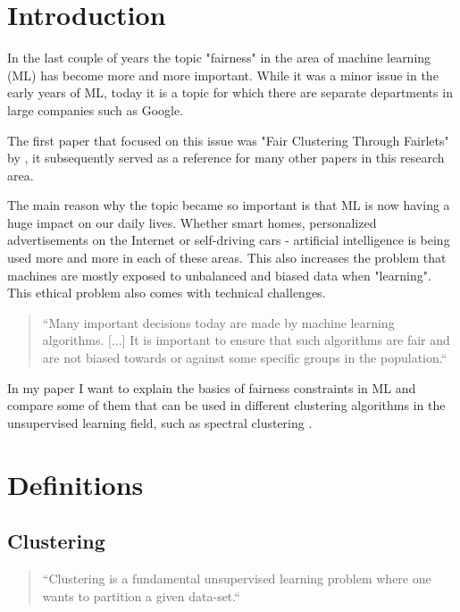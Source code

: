 \section{Introduction}

In the last couple of years the topic "fairness" in the area of machine learning (ML) has become more and more important. While it was a minor issue in the early years of ML, today it is a topic for which there are separate departments in large companies such as Google.

The first paper that focused on this issue was "Fair Clustering Through Fairlets" by \cite{Chierichetti2018}, it subsequently served as a reference for many other papers in this research area.

The main reason why the topic became so important is that ML is now having a huge impact on our daily lives. Whether smart homes, personalized advertisements on the Internet or self-driving cars - artificial intelligence is being used more and more in each of these areas. This also increases the problem that machines are mostly exposed to unbalanced and biased data when "learning". This ethical problem also comes with technical challenges.

\begin{quote}
    ``Many important decisions today are made by machine learning algorithms. [...] It is important to ensure that such algorithms are fair and are not biased towards or against some specific groups in the population.``
    
\autocite[1]{Bera2019}
\end{quote}


In my paper I want to explain the basics of fairness constraints in ML and compare some of them that can be used in different clustering algorithms in the unsupervised learning \autocite[]{Barlow1989} field, such as spectral clustering \autocite[]{Kleindessner2019}.


\section{Definitions}

\subsection{Clustering}
\begin{quote}
    ``Clustering is a fundamental unsupervised learning problem where one wants to partition a given data-set.``

\autocite[1]{Bera2019}
\end{quote}

